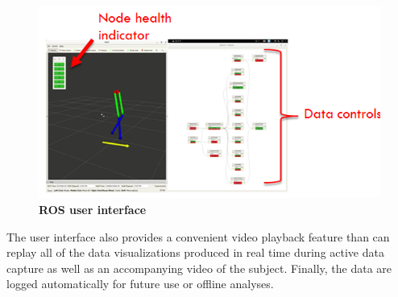 \documentclass[conference]{IEEEtran}
\begin{document}
\begin{figure}[h]
  \centering
  \includegraphics[width=\columnwidth]{figs/gui}
  \caption{{\bf ROS user interface}}
  \label{fig:gui}
\end{figure}
The user interface also provides a convenient video playback feature than can replay all
of the data visualizations produced in real time during active data capture as well as an
accompanying video of the subject. Finally, the data are logged automatically for future
use or offline analyses. 
\end{document}
